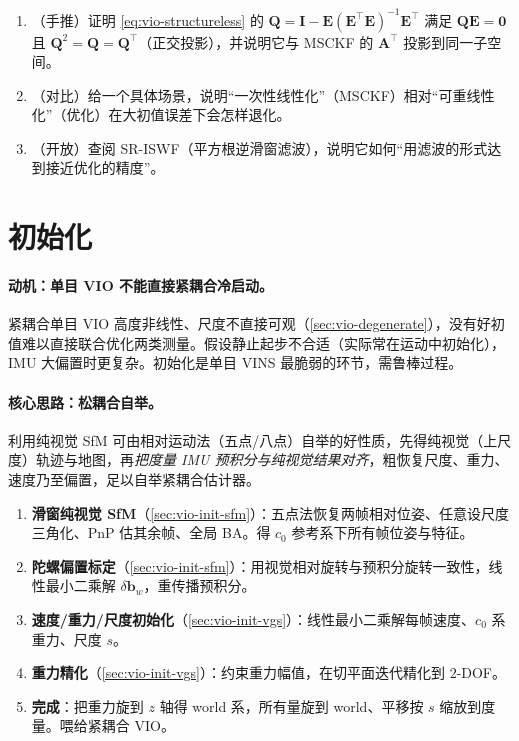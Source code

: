 \begin{practice}
\begin{enumerate}
  \item （手推）证明 \cref{eq:vio-structureless} 的 $\mathbf{Q}=\mathbf{I}-\mathbf{E}(\mathbf{E}^\top\mathbf{E})^{-1}\mathbf{E}^\top$ 满足 $\mathbf{Q}\mathbf{E}=\mathbf{0}$ 且 $\mathbf{Q}^2=\mathbf{Q}=\mathbf{Q}^\top$（正交投影），并说明它与 MSCKF 的 $\mathbf{A}^\top$ 投影到同一子空间。
  \item （对比）给一个具体场景，说明“一次性线性化”（MSCKF）相对“可重线性化”（优化）在大初值误差下会怎样退化。
  \item （开放）查阅 SR-ISWF（平方根逆滑窗滤波），说明它如何“用滤波的形式达到接近优化的精度”。
\end{enumerate}
\end{practice}

\section{初始化}
\label{sec:vio-init}

\paragraph{动机：单目 VIO 不能直接紧耦合冷启动。}
紧耦合单目 VIO 高度非线性、尺度不直接可观（\cref{sec:vio-degenerate}），没有好初值难以直接联合优化两类测量\cite{qin2018vins}。假设静止起步不合适（实际常在运动中初始化），IMU 大偏置时更复杂。初始化是单目 VINS 最脆弱的环节，需鲁棒过程。

\paragraph{核心思路：松耦合自举。}
利用纯视觉 SfM 可由相对运动法（五点/八点）自举的好性质，先得纯视觉（上尺度）轨迹与地图，再\emph{把度量 IMU 预积分与纯视觉结果对齐}，粗恢复尺度、重力、速度乃至偏置，足以自举紧耦合估计器\cite{qin2018vins}。

\begin{algo}\label{alg:vio-init}
\begin{enumerate}
  \item \textbf{滑窗纯视觉 SfM}（\cref{sec:vio-init-sfm}）：五点法恢复两帧相对位姿、任意设尺度三角化、PnP 估其余帧、全局 BA。得 $c_0$ 参考系下所有帧位姿与特征。
  \item \textbf{陀螺偏置标定}（\cref{sec:vio-init-sfm}）：用视觉相对旋转与预积分旋转一致性，线性最小二乘解 $\delta\mathbf{b}_w$，重传播预积分。
  \item \textbf{速度/重力/尺度初始化}（\cref{sec:vio-init-vgs}）：线性最小二乘解每帧速度、$c_0$ 系重力、尺度 $s$。
  \item \textbf{重力精化}（\cref{sec:vio-init-vgs}）：约束重力幅值，在切平面迭代精化到 $2$-DOF。
  \item \textbf{完成}：把重力旋到 $z$ 轴得 world 系，所有量旋到 world、平移按 $s$ 缩放到度量。喂给紧耦合 VIO。
\end{enumerate}
\end{algo}

